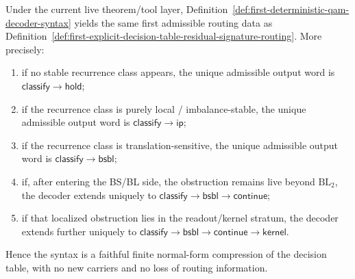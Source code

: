 \begin{proposition}
\label{prop:deterministic-decoder-syntax-equivalent-current-decision-table}
Under the current live theorem/tool layer, Definition~\ref{def:first-deterministic-qam-decoder-syntax} yields the same first admissible routing data as Definition~\ref{def:first-explicit-decision-table-residual-signature-routing}. More precisely:
\begin{enumerate}[label=(\roman*)]
 \item if no stable recurrence class appears, the unique admissible output word is \(\mathsf{classify}\to\mathsf{hold}\);
 \item if the recurrence class is purely local / imbalance-stable, the unique admissible output word is \(\mathsf{classify}\to\mathsf{ip}\);
 \item if the recurrence class is translation-sensitive, the unique admissible output word is \(\mathsf{classify}\to\mathsf{bsbl}\);
 \item if, after entering the BS/BL side, the obstruction remains live beyond \(\mathrm{BL}_2\), the decoder extends uniquely to \(\mathsf{classify}\to\mathsf{bsbl}\to\mathsf{continue}\);
 \item if that localized obstruction lies in the readout/kernel stratum, the decoder extends further uniquely to \(\mathsf{classify}\to\mathsf{bsbl}\to\mathsf{continue}\to\mathsf{kernel}\).
\end{enumerate}
Hence the syntax is a faithful finite normal-form compression of the decision table, with no new carriers and no loss of routing information.
\end{proposition}

